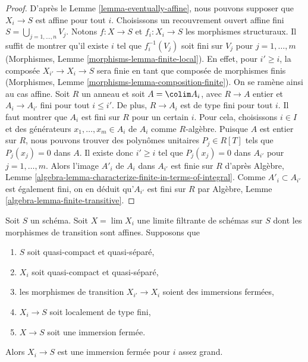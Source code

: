 \begin{proof}
D'après le Lemme \ref{lemma-eventually-affine}, nous pouvons supposer que
$X_i \to S$ est affine pour tout $i$. Choisissons un recouvrement ouvert
affine fini $S = \bigcup_{j = 1, \ldots, n} V_j$. Notons $f : X \to S$ et
$f_i : X_i \to S$ les morphismes structuraux. Il suffit de montrer qu'il
existe $i$ tel que $f_i^{-1}(V_j)$ soit fini sur $V_j$ pour
$j = 1, \ldots, m$ (Morphismes,
Lemme \ref{morphisms-lemma-finite-local}). En effet, pour $i' \geq i$, la
composée $X_{i'} \to X_i \to S$ sera finie en tant que composée de morphismes
finis (Morphismes, Lemme \ref{morphisms-lemma-composition-finite}). On se
ramène ainsi au cas affine. Soit $R$ un anneau et soit $A = \colim A_i$, avec
$R \to A$ entier et $A_i \to A_{i'}$ fini pour tout $i \leq i'$. De plus,
$R \to A_i$ est de type fini pour tout $i$. Il faut montrer que $A_i$ est
fini sur $R$ pour un certain $i$. Pour cela, choisissons $i \in I$ et des
générateurs $x_1, \ldots, x_m \in A_i$ de $A_i$ comme $R$-algèbre. Puisque
$A$ est entier sur $R$, nous pouvons trouver des polynômes unitaires
$P_j \in R[T]$ tels que $P_j(x_j) = 0$ dans $A$. Il existe donc
$i' \geq i$ tel que $P_j(x_j) = 0$ dans $A_{i'}$ pour
$j = 1, \ldots, m$. Alors l'image $A'_i$ de $A_i$ dans $A_{i'}$ est finie
sur $R$ d'après Algèbre,
Lemme \ref{algebra-lemma-characterize-finite-in-terms-of-integral}. Comme
$A'_i \subset A_{i'}$ est également fini, on en déduit qu'$A_{i'}$ est fini
sur $R$ par Algèbre, Lemme \ref{algebra-lemma-finite-transitive}.
\end{proof}

\begin{lemma}
\label{lemma-eventually-closed-immersion}
Soit $S$ un schéma. Soit $X = \lim X_i$ une limite filtrante de schémas sur
$S$ dont les morphismes de transition sont affines. Supposons que
\begin{enumerate}
\item $S$ soit quasi-compact et quasi-séparé,
\item $X_i$ soit quasi-compact et quasi-séparé,
\item les morphismes de transition $X_{i'} \to X_i$ soient des immersions
fermées,
\item $X_i \to S$ soit localement de type fini,
\item $X \to S$ soit une immersion fermée.
\end{enumerate}
Alors $X_i \to S$ est une immersion fermée pour $i$ assez grand.
\end{lemma}

